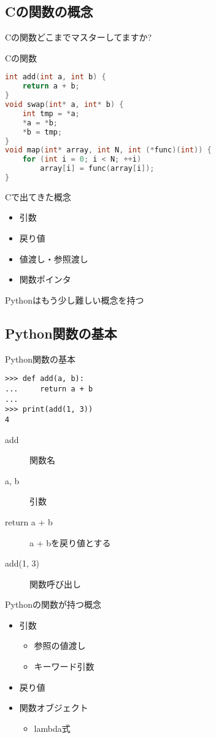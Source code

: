 \documentclass[12pt, xetex, xcolor=pdftex, dvipsnames]{beamer}
\begin{document}
\subsection{Cの関数の概念}
\begin{frame}
    \alert{\Large Cの関数どこまでマスターしてますか?}
\end{frame}
\begin{frame}[fragile]{Cの関数}
    \begin{lstlisting}[language={C}]
int add(int a, int b) {
    return a + b;
}
void swap(int* a, int* b) {
    int tmp = *a;
    *a = *b;
    *b = tmp;
}
void map(int* array, int N, int (*func)(int)) {
    for (int i = 0; i < N; ++i)
        array[i] = func(array[i]);
}
    \end{lstlisting}
\end{frame}
\begin{frame}{Cで出てきた概念}
    \begin{itemize}
        \item 引数
        \item 戻り値
        \item 値渡し・参照渡し
        \item 関数ポインタ
    \end{itemize}

    \pause
    Pythonはもう少し難しい概念を持つ
\end{frame}
\subsection{Python関数の基本}
\begin{frame}[fragile]{Python関数の基本}
\begin{lstlisting}
>>> def add(a, b):
...     return a + b
... 
>>> print(add(1, 3))
4
\end{lstlisting}
\pause
\begin{description}
\item[add] 関数名
\item[a, b] 引数
\item[return a + b] a + bを戻り値とする
\item[add(1, 3)] 関数呼び出し
\end{description}
\end{frame}
\begin{frame}{Pythonの関数が持つ概念}
    \begin{itemize}
        \item 引数
        \begin{itemize}
            \item 参照の値渡し
            \item キーワード引数
        \end{itemize}
        \item 戻り値
        \item 関数オブジェクト
        \begin{itemize}
            \item lambda式
        \end{itemize}
    \end{itemize}
\end{frame}
\end{document}
